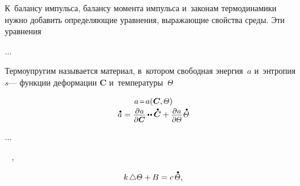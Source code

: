\label{section:constitutiveequations.thermoelasticity}

\begin{otherlanguage}{russian}

К~балансу импульса, балансу момента импульса и~законам термодинамики нужно добавить определяющие уравнения, выражающие свойства среды. Эти уравнения

...

Термоупругим называется материал, в~котором свободная энергия~$a$ и~энтропия~$s$\:--- функции деформации $\bm{C}$ и~температуры~$\temperaturefield$

\nopagebreak\vspace{-0.1em}\begin{equation*}\begin{array}{c}
a \narroweq a(\bm{C} \hspace{-0.1ex} , \temperaturefield)
\\[.2em]
%
\mathdotabove{a}
= \scalebox{0.92}[0.92]{$ \displaystyle \frac{\raisemath{-0.2em}{\partial\hspace{.1ex} a}}{\partial \bm{C}}$}
\hspace{-0.15ex} \dotdotp \hspace{-0.1ex} \mathdotabove{\bm{C}}
+ \scalebox{0.92}[0.92]{$ \displaystyle \frac{\raisemath{-0.2em}{\partial\hspace{.1ex} a}}{\partial \temperaturefield}$}
\hspace{.2ex} \mathdotabove{\temperaturefield}
\end{array}\end{equation*}

...

\end{otherlanguage}



\label{section:heatequation}

~
,

\nopagebreak\en{\vspace{-0.15em}}\ru{\vspace{-0.88em}}\begin{equation}\label{heatequation:mathematicalphysics}
k \hspace{-0.1ex} \Laplacian \temperaturefield + \hspace{-0.1ex} B = c \hspace{.33ex} \mathdotabove{\temperaturefield} ,
\end{equation}

